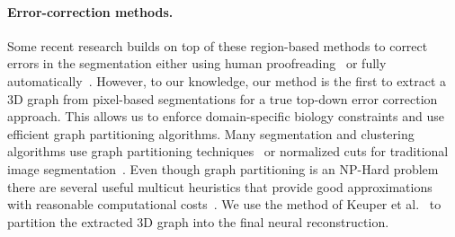 \paragraph{Error-correction methods.}
Some recent research builds on top of these region-based methods to correct errors in the segmentation either using human proofreading~\cite{haehn2017guided,haehn2014design,mojo2} or fully automatically~\cite{rolnick2017morphological,error_correction_using_CNN}.
However, to our knowledge, our method is the first to extract a 3D graph from pixel-based segmentations for a true top-down error correction approach. This allows us to enforce domain-specific biology constraints and use efficient graph partitioning algorithms. Many segmentation and clustering algorithms use graph partitioning techniques~\cite{andres2012globally} or normalized cuts for traditional image segmentation~\cite{kappes2016higher,shi2000normalized,tatiraju2008image}.
Even though graph partitioning is an NP-Hard problem~\cite{demaine2006correlation} there are several useful multicut heuristics that provide good approximations with reasonable computational costs~\cite{horvnakova2017analysis}. We use the method of Keuper et al.~\cite{keuper2015efficient} to partition the extracted 3D graph into the final neural reconstruction.
